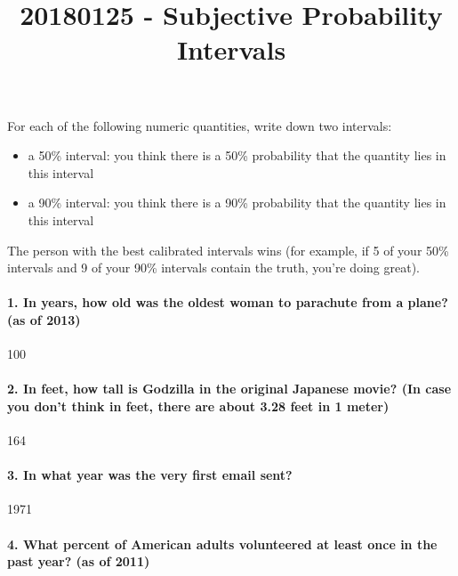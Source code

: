 \documentclass[]{article}
\title{20180125 - Subjective Probability Intervals}
\author{}
\date{}
\providecommand{\tightlist}{%
  \setlength{\itemsep}{0pt}\setlength{\parskip}{0pt}}
\let\oldparagraph\paragraph
\renewcommand{\paragraph}[1]{\oldparagraph{#1}\mbox{}}
\begin{document}
\maketitle

For each of the following numeric quantities, write down two intervals:

\begin{itemize}
\tightlist
\item
  a 50\% interval: you think there is a 50\% probability that the
  quantity lies in this interval
\item
  a 90\% interval: you think there is a 90\% probability that the
  quantity lies in this interval
\end{itemize}

The person with the best calibrated intervals wins (for example, if 5 of
your 50\% intervals and 9 of your 90\% intervals contain the truth,
you're doing great).

\paragraph{1. In years, how old was the oldest woman to parachute from a
plane? (as of
2013)}\label{in-years-how-old-was-the-oldest-woman-to-parachute-from-a-plane-as-of-2013}

100

\paragraph{2. In feet, how tall is Godzilla in the original Japanese
movie? (In case you don't think in feet, there are about 3.28 feet in 1
meter)}\label{in-feet-how-tall-is-godzilla-in-the-original-japanese-movie-in-case-you-dont-think-in-feet-there-are-about-3.28-feet-in-1-meter}

164

\paragraph{3. In what year was the very first email
sent?}\label{in-what-year-was-the-very-first-email-sent}

1971

\paragraph{4. What percent of American adults volunteered at least once
in the past year? (as of
2011)}\label{what-percent-of-american-adults-volunteered-at-least-once-in-the-past-year-as-of-2011}
\end{document}
